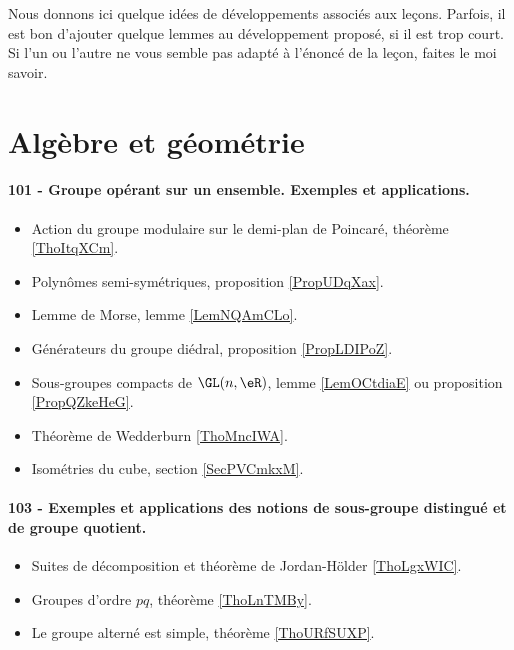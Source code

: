 
Nous donnons ici quelque idées de développements associés aux leçons. Parfois, il est bon d'ajouter quelque lemmes au développement proposé, si il est trop court. Si l'un ou l'autre ne vous semble pas adapté à l'énoncé de la leçon, faites le moi savoir.

\section{Algèbre et géométrie}

\paragraph{101 - Groupe opérant sur un ensemble. Exemples et applications.}
\begin{itemize}
    \item Action du groupe modulaire sur le demi-plan de Poincaré, théorème \ref{ThoItqXCm}.
    \item Polynômes semi-symétriques, proposition \ref{PropUDqXax}.
    \item Lemme de Morse, lemme \ref{LemNQAmCLo}.
    \item Générateurs du groupe diédral, proposition \ref{PropLDIPoZ}.
    \item Sous-groupes compacts de \( \GL(n,\eR)\), lemme \ref{LemOCtdiaE} ou proposition \ref{PropQZkeHeG}.
    \item Théorème de Wedderburn \ref{ThoMncIWA}.
    \item Isométries du cube, section \ref{SecPVCmkxM}.
\end{itemize}
\paragraph{103 - Exemples et applications des notions de sous-groupe distingué et de groupe quotient.}
\begin{itemize}
    \item Suites de décomposition et théorème de Jordan-Hölder \ref{ThoLgxWIC}.
    \item Groupes d'ordre \( pq\), théorème \ref{ThoLnTMBy}.
    \item Le groupe alterné est simple, théorème \ref{ThoURfSUXP}.
\end{itemize}
